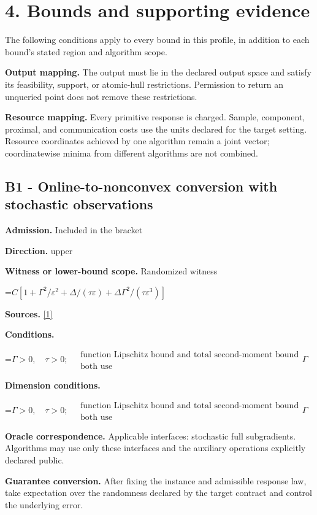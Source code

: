 \documentclass[10pt,a4paper]{article}
\newcommand{\AtlasMath}[1]{\par\begingroup\centering\setbox0=\hbox{$\displaystyle #1$}\ifdim\wd0>1.4\linewidth\typeout{ATLAS WIDE FORMULA: \the\wd0}\fi\ifdim\wd0>\linewidth\resizebox{\linewidth}{!}{\box0}\else\box0\fi\par\endgroup}
\begin{document}
\section{4. Bounds and supporting evidence}
The following conditions apply to every bound in this profile, in addition to each bound's stated region and algorithm scope.

\textbf{Output mapping.} The output must lie in the declared output space and satisfy its feasibility, support, or atomic-hull restrictions. Permission to return an unqueried point does not remove these restrictions.

\textbf{Resource mapping.} Every primitive response is charged. Sample, component, proximal, and communication costs use the units declared for the target setting. Resource coordinates achieved by one algorithm remain a joint vector; coordinatewise minima from different algorithms are not combined.

\subsection{B1 - Online-to-nonconvex conversion with stochastic observations}
\textbf{Admission.} Included in the bracket

\textbf{Direction.} upper

\textbf{Witness or lower-bound scope.} Randomized witness

\AtlasMath{C[1+\Gamma^2/\varepsilon^2+\Delta/(\tau\varepsilon)+\Delta\Gamma^2/(\tau\varepsilon^3)]}
\textbf{Sources.} \href{https://arxiv.org/pdf/2302.03775}{[1]}

\textbf{Conditions.} 
\AtlasMath{\Gamma>0,\quad\tau>0;\quad\substack{\text{function Lipschitz bound and total second-moment bound}\\\text{both use}}\Gamma}


\textbf{Dimension conditions.} 
\AtlasMath{\Gamma>0,\quad\tau>0;\quad\substack{\text{function Lipschitz bound and total second-moment bound}\\\text{both use}}\Gamma}


\textbf{Oracle correspondence.} Applicable interfaces: stochastic full subgradients. Algorithms may use only these interfaces and the auxiliary operations explicitly declared public.

\textbf{Guarantee conversion.} After fixing the instance and admissible response law, take expectation over the randomness declared by the target contract and control the underlying error.
\end{document}
